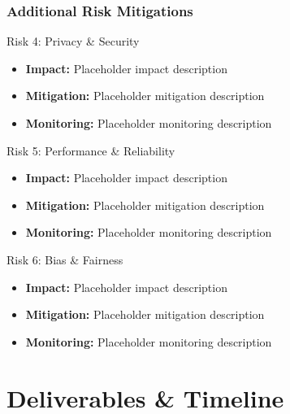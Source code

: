 \begin{frame}
\frametitle{Additional Risk Mitigations}
\begin{block}{Risk 4: Privacy \& Security}
\begin{itemize}
\item \textbf{Impact:} Placeholder impact description
\item \textbf{Mitigation:} Placeholder mitigation description
\item \textbf{Monitoring:} Placeholder monitoring description
\end{itemize}
\end{block}

\begin{block}{Risk 5: Performance \& Reliability}
\begin{itemize}
\item \textbf{Impact:} Placeholder impact description
\item \textbf{Mitigation:} Placeholder mitigation description
\item \textbf{Monitoring:} Placeholder monitoring description
\end{itemize}
\end{block}

\begin{block}{Risk 6: Bias \& Fairness}
\begin{itemize}
\item \textbf{Impact:} Placeholder impact description
\item \textbf{Mitigation:} Placeholder mitigation description
\item \textbf{Monitoring:} Placeholder monitoring description
\end{itemize}
\end{block}
\end{frame}

\section{Deliverables \& Timeline}\label{sec:deliverables}

